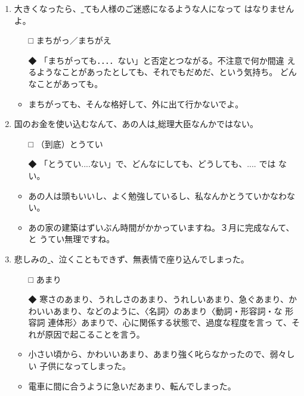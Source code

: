 \documentclass[
uplatex,
b5paper,
10pt,
dvipdfmx
]{jsbook}
\begin{document}
\begin{enumerate}
\item 大きくなったら、\underline{    }ても人様のご迷惑になるような人になって
      はなりませんよ。
\begin{itemize}
\item[□] まちがっ／まちがえ
\item[◆] 「まちがっても．．．．ない」と否定とつながる。不注意で何か間違
	  えるようなことがあったとしても、それでもだめだ、という気持ち。
	  どんなことがあっても。
\end{itemize}
\begin{itemize}
\item まちがっても、そんな格好して、外に出て行かないでよ。
\end{itemize}

\item 国のお金を使い込むなんて、あの人は\underline{   }総理大臣なんかではない。
\begin{itemize}
\item[□] （到底）とうてい
\item[◆] 「とうてい....ない」で、どんなにしても、どうしても、....  では
	  ない。
\end{itemize}
\begin{itemize}
\item あの人は頭もいいし、よく勉強しているし、私なんかとうていかなわない。
\item あの家の建築はずいぶん時間がかかっていますね。３月に完成なんて、と
      うてい無理ですね。
\end{itemize}

\item 悲しみの\underline{   }、泣くこともできず、無表情で座り込んでしまった。
\begin{itemize}
\item[□] あまり
\item[◆] 寒さのあまり、うれしさのあまり、うれしいあまり、急ぐあまり、か
	  わいいあまり、などのように、〈名詞〉のあまり〈動詞・形容詞・な
	  形容詞 連体形〉あまりで、心に関係する状態で、過度な程度を言っ
	  て、それが原因で起こることを言う。
\end{itemize}
\begin{itemize}
\item 小さい頃から、かわいいあまり、あまり強く叱らなかったので、弱々しい
      子供になってしまった。
\item 電車に間に合うように急いだあまり、転んでしまった。
\end{itemize}


\end{enumerate}
\end{document}
